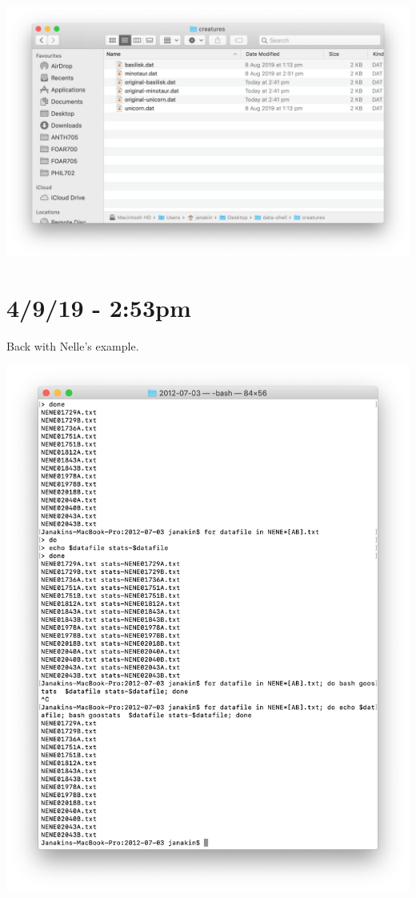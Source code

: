 \documentclass{article}
\begin{document}
\includegraphics[width=\textwidth]{figq.png}

\section*{4/9/19 - 2:53pm}

Back with Nelle's example.

\includegraphics[width=\textwidth]{figr.png}
\end{document}
